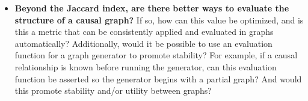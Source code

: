 \documentclass[]{svjour3}
\begin{document}
\begin{itemize}


   \item 

    \textbf{Beyond the Jaccard index, are there better ways to evaluate the structure of a causal graph?}  If so, how can this value be optimized, and is this a metric that can be consistently applied and evaluated in graphs automatically?  Additionally, would it be possible to use an evaluation function for a graph generator to promote stability? For example, if a causal relationship is known before running the generator, can this evaluation function be asserted so the generator begins with a partial graph? And would this promote stability and/or utility between graphs?  
    

 
\end{itemize} 
\end{document}

